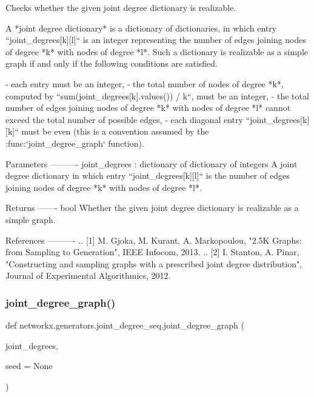 \begin{DoxyVerb}Checks whether the given joint degree dictionary is realizable.

A *joint degree dictionary* is a dictionary of dictionaries, in
which entry ``joint_degrees[k][l]`` is an integer representing the
number of edges joining nodes of degree *k* with nodes of degree
*l*. Such a dictionary is realizable as a simple graph if and only
if the following conditions are satisfied.

- each entry must be an integer,
- the total number of nodes of degree *k*, computed by
  ``sum(joint_degrees[k].values()) / k``, must be an integer,
- the total number of edges joining nodes of degree *k* with
  nodes of degree *l* cannot exceed the total number of possible edges,
- each diagonal entry ``joint_degrees[k][k]`` must be even (this is
  a convention assumed by the :func:`joint_degree_graph` function).


Parameters
----------
joint_degrees :  dictionary of dictionary of integers
    A joint degree dictionary in which entry ``joint_degrees[k][l]``
    is the number of edges joining nodes of degree *k* with nodes of
    degree *l*.

Returns
-------
bool
    Whether the given joint degree dictionary is realizable as a
    simple graph.

References
----------
.. [1] M. Gjoka, M. Kurant, A. Markopoulou, "2.5K Graphs: from Sampling
   to Generation", IEEE Infocom, 2013.
.. [2] I. Stanton, A. Pinar, "Constructing and sampling graphs with a
   prescribed joint degree distribution", Journal of Experimental
   Algorithmics, 2012.
\end{DoxyVerb}
 \mbox{\label{namespacenetworkx_1_1generators_1_1joint__degree__seq_ab07b587a34ff4300e8b9d7b03bd39067}} 
\subsubsection{\texorpdfstring{joint\+\_\+degree\+\_\+graph()}{joint\_degree\_graph()}}
{\footnotesize\ttfamily def networkx.\+generators.\+joint\+\_\+degree\+\_\+seq.\+joint\+\_\+degree\+\_\+graph (\begin{DoxyParamCaption}\item[{}]{joint\+\_\+degrees,  }\item[{}]{seed = {\ttfamily None} }\end{DoxyParamCaption})}

